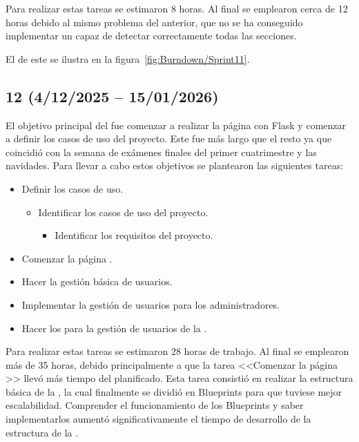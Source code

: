 Para realizar estas tareas se estimaron 8 horas. Al final se emplearon cerca de 12 horas debido al mismo problema del  anterior, que no se ha conseguido implementar un  capaz de detectar correctamente todas las secciones.

El  de este  se ilustra en la figura~\ref{fig:Burndown/Sprint11}.

\subsection{ 12 (4/12/2025 -- 15/01/2026)}
El objetivo principal del  fue comenzar a realizar la página  con Flask y comenzar a definir los casos de uso del proyecto. Este  fue más largo que el resto ya que coincidió con la semana de exámenes finales del primer cuatrimestre y las navidades. Para llevar a cabo estos objetivos se plantearon las siguientes tareas:
\begin{itemize}
\tightlist
	\item Definir los casos de uso.
	\begin{itemize}
	\tightlist
		\item Identificar los casos de uso del proyecto.
		\begin{itemize}
		\tightlist
			\item Identificar los requisitos del proyecto.
		\end{itemize}
	\end{itemize}
	\item Comenzar la página .
	\item Hacer la gestión básica de usuarios.
	\item Implementar la gestión de usuarios para los administradores.
	\item Hacer los  para la gestión de usuarios de la .
\end{itemize}

Para realizar estas tareas se estimaron 28 horas de trabajo. Al final se emplearon más de 35 horas, debido principalmente a que la tarea <<Comenzar la página >> llevó más tiempo del planificado. Esta tarea consistió en realizar la estructura básica de la , la cual finalmente  se dividió en Blueprints para que tuviese mejor escalabilidad. Comprender el funcionamiento de los Blueprints y saber implementarlos aumentó significativamente el tiempo de desarrollo de la estructura de la .

